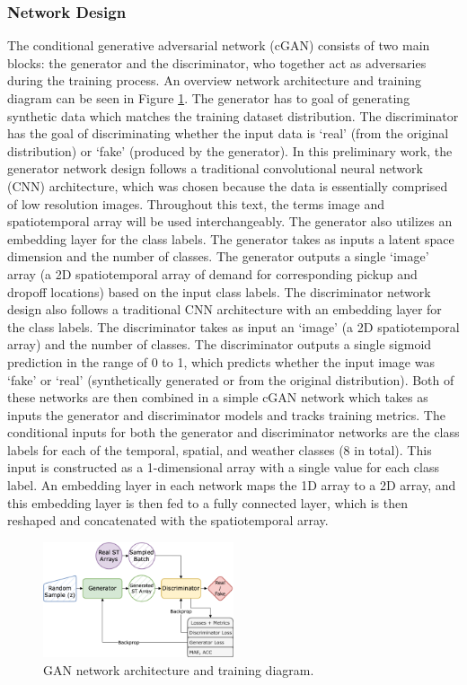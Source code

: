 \documentclass[conference]{IEEEtran}
\begin{document}
\subsubsection{Network Design}
The conditional generative adversarial network (cGAN) consists of two main blocks: the generator and the discriminator, who 
together act as adversaries during the training process. An overview network architecture and training diagram can be seen in Figure
\ref{fig:gan}.
The generator has to goal of generating synthetic data which matches 
the training dataset distribution. The discriminator has the goal of discriminating whether the input data is ‘real’ (from the 
original distribution) or ‘fake’ (produced by the generator). In this preliminary work, the generator network design follows a 
traditional convolutional neural network (CNN) architecture, which was chosen because the data is essentially comprised of low 
resolution images. Throughout this text, the terms image and spatiotemporal array will be used interchangeably. The generator 
also utilizes an embedding layer for the class labels. The generator takes as inputs a latent space dimension and the number of 
classes. The generator outputs a single ‘image’ array (a 2D spatiotemporal array of demand for corresponding pickup and dropoff 
locations) based on the input class labels. The discriminator network design also follows a traditional CNN architecture with an
embedding layer for the class labels. The discriminator takes as input an ‘image’ (a 2D spatiotemporal array) and the number of
classes. The discriminator outputs a single sigmoid prediction in the range of 0 to 1, which predicts whether the input image 
was ‘fake’ or ‘real’ (synthetically generated or from the original distribution).  Both of these networks are then combined in
a simple cGAN network which takes as inputs the generator and discriminator models and tracks training metrics. The conditional
inputs for both the generator and discriminator networks are the class labels for each of the temporal, spatial, and weather 
classes (8 in total). This input is constructed as a 1-dimensional array with a single value for each class label. An embedding 
layer in each network maps the 1D array to a 2D array, and this embedding layer is then fed to a fully connected layer, which
is then reshaped and concatenated with the spatiotemporal array. 

\begin{figure}[t]
  \centerline{\includegraphics[width=0.5\textwidth]{figs/ganArchitecture.png}}
  \caption{GAN network architecture and training diagram.}
  \label{fig:gan}
  \end{figure}
\end{document}
